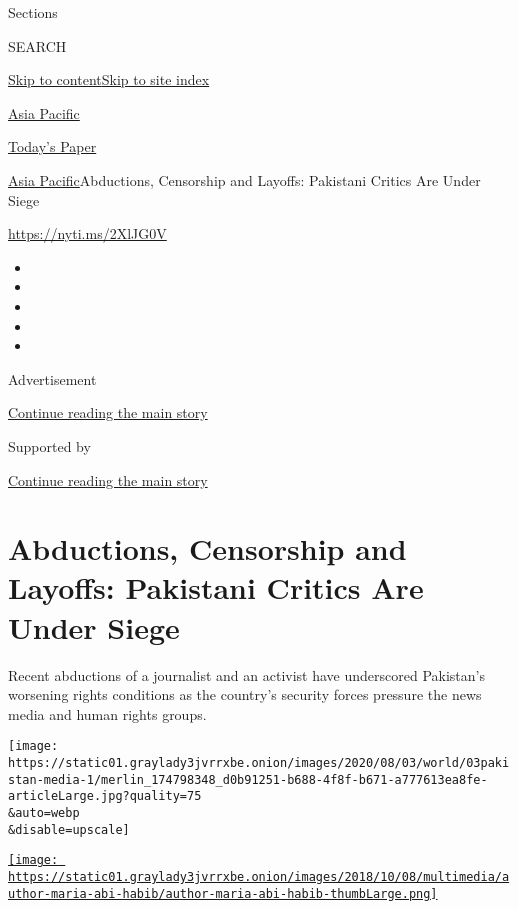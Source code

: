 Sections

SEARCH

\protect\hyperlink{site-content}{Skip to
content}\protect\hyperlink{site-index}{Skip to site index}

\href{https://www.nytimes3xbfgragh.onion/section/world/asia}{Asia
Pacific}

\href{https://myaccount.nytimes3xbfgragh.onion/auth/login?response_type=cookie\&client_id=vi}{}

\href{https://www.nytimes3xbfgragh.onion/section/todayspaper}{Today's
Paper}

\href{/section/world/asia}{Asia Pacific}\textbar{}Abductions, Censorship
and Layoffs: Pakistani Critics Are Under Siege

\url{https://nyti.ms/2XlJG0V}

\begin{itemize}
\item
\item
\item
\item
\item
\end{itemize}

Advertisement

\protect\hyperlink{after-top}{Continue reading the main story}

Supported by

\protect\hyperlink{after-sponsor}{Continue reading the main story}

\hypertarget{abductions-censorship-and-layoffs-pakistani-critics-are-under-siege}{%
\section{Abductions, Censorship and Layoffs: Pakistani Critics Are Under
Siege}\label{abductions-censorship-and-layoffs-pakistani-critics-are-under-siege}}

Recent abductions of a journalist and an activist have underscored
Pakistan's worsening rights conditions as the country's security forces
pressure the news media and human rights groups.

\texttt{[image: https://static01.graylady3jvrrxbe.onion/images/2020/08/03/world/03pakistan-media-1/merlin\_174798348\_d0b91251-b688-4f8f-b671-a777613ea8fe-articleLarge.jpg?quality=75\\\&auto=webp\\\&disable=upscale]}

\href{https://www.nytimes3xbfgragh.onion/by/maria-abi-habib}{\texttt{[image: https://static01.graylady3jvrrxbe.onion/images/2018/10/08/multimedia/author-maria-abi-habib/author-maria-abi-habib-thumbLarge.png]}}

